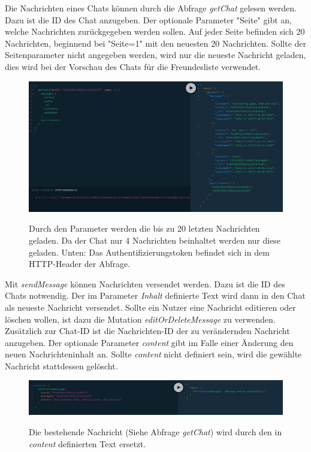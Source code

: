 Die Nachrichten eines Chats können durch die Abfrage \textit{getChat} gelesen werden. Dazu ist die ID des Chat anzugeben. Der optionale Parameter "Seite" gibt an, welche Nachrichten zurückgegeben werden sollen. Auf jeder Seite befinden sich 20 Nachrichten, beginnend bei "Seite=1" mit den neuesten 20 Nachrichten. Sollte der Seitenparameter nicht angegeben werden, wird nur die neueste Nachricht geladen, dies wird bei der Vorschau des Chats für die Freundesliste verwendet.

\begin{figure}
	\centering
    \includegraphics[width=\textwidth]{sources/graphiql_getChat.png}\cite{}
	\caption{Durch den Parameter  werden die bis zu 20 letzten Nachrichten geladen. Da der Chat nur 4 Nachrichten beinhaltet werden nur diese geladen. Unten: Das Authentifizierungstoken  befindet sich in dem HTTP-Header der Abfrage.}
	\label{fig7}
\end{figure}

Mit \textit{sendMessage} können Nachrichten versendet werden. Dazu ist die ID des Chats notwendig. Der im Parameter \textit{Inhalt} definierte Text wird dann in den Chat als neueste Nachricht versendet.
Sollte ein Nutzer eine Nachricht editieren oder löschen wollen, ist dazu die Mutation \textit{editOrDeleteMessage} zu verwenden. Zusätzlich zur Chat-ID ist die Nachrichten-ID der zu verändernden Nachricht anzugeben. Der optionale Parameter \textit{content} gibt im Falle einer Änderung den neuen Nachrichteninhalt an. Sollte \textit{content} nicht definiert sein, wird die gewählte Nachricht stattdessen gelöscht. 

\begin{figure}
	\centering
    \includegraphics[width=\textwidth]{sources/graphiql_editMessage.png}\cite{}
	\caption{Die bestehende Nachricht (Siehe Abfrage \textit{getChat}) wird durch den in \textit{content} definierten Text ersetzt.}
	\label{fig8}
\end{figure}

